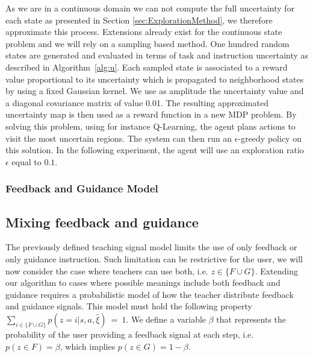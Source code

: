 As we are in a continuous domain we can not compute the full uncertainty for each state as presented in Section \ref{sec:ExplorationMethod}, we therefore approximate this process. Extensions already exist for the continuous state problem \cite{nouri2010dimension,Hester13aamas} and we will rely on a sampling based method. One hundred random states are generated and evaluated in terms of task and instruction uncertainty as described in Algorithm~\ref{alg:u}. Each sampled state is associated to a reward value proportional to its uncertainty which is propagated to neighborhood states by using a fixed Gaussian kernel. We use as amplitude the uncertainty value and a diagonal covariance matrix of value 0.01. The resulting approximated uncertainty map is then used as a reward function in a new MDP problem. By solving this problem, using for instance Q-Learning, the agent plans actions to visit the most uncertain regions. The system can then run an $\epsilon$-greedy policy on this solution. In the following experiment, the agent will use an exploration ratio $\epsilon$ equal to $0.1$.

\subsubsection{Feedback and Guidance Model}
\label{sec:advancedModel}


\subsection{Mixing feedback and guidance}
\label{sec:mixing}

The previously defined teaching signal model limits the use of only feedback or only guidance instruction. Such limitation can be restrictive for the user, we will now consider the case where teachers can use both, i.e. $z \in \{F \cup G\}$. Extending our algorithm to cases where possible meanings include both feedback and guidance requires a probabilistic model of how the teacher distribute feedback and guidance signals. This model must hold the following property $\sum_{i \in \{F \cup G\}} p(z = i|s,a,\hat{\xi})~=~1$. We define a variable $\beta$ that represents the probability of the user providing a feedback signal at each step, i.e. $p(z \in F) = \beta$, which implies $p(z \in G) = 1 - \beta$. 

